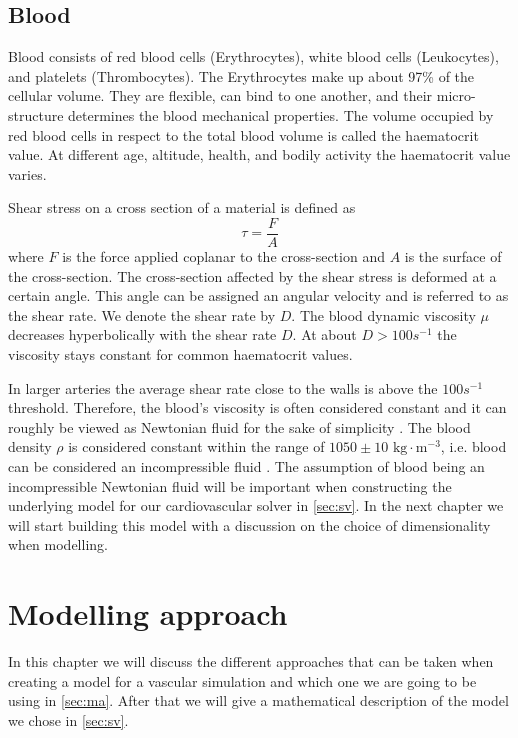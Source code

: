 \documentclass[a4paper, oneside]{discothesis}
\begin{document}
\section{Blood} \label{sec:b}
Blood consists of red blood cells (Erythrocytes), white blood cells (Leukocytes), and platelets (Thrombocytes).
The Erythrocytes make up about 97\% of the cellular volume.
They are flexible, can bind to one another, and their micro-structure determines the blood mechanical properties.
The volume occupied by red blood cells in respect to the total blood volume is called the haematocrit value.
At different age, altitude, health, and bodily activity the haematocrit value varies.

Shear stress on a cross section of a material is defined as 
\begin{equation}
	\tau = \frac{F}{A}
\end{equation}
where $F$ is the force applied coplanar to the cross-section and $A$ is the surface of the cross-section.
The cross-section affected by the shear stress is deformed at a certain angle. 
This angle can be assigned an angular velocity and is referred to as the shear rate.
We denote the shear rate by $D$. \cite{köppl2023dimension}
The blood dynamic viscosity $\mu$ decreases hyperbolically with the shear rate $D$.
At about $D > 100s^{-1}$ the viscosity stays constant for common haematocrit values.

In larger arteries the average shear rate close to the walls is above the $100s^{-1}$ threshold. \cite{MCDbook}
Therefore, the blood's viscosity is often considered constant and it can roughly be viewed as Newtonian fluid for the sake of simplicity \cite{fung2013biomechanics,guyton2006textbook,MCDbook,pedley_1980,zamir2000physics,zamir2006physics}. 
The blood density $\rho$ is considered constant within the range of $1050 \pm 10 \text{ kg}\cdot\text{m}^{-3}$, i.e. blood can be considered an incompressible fluid \cite{PMID:2658951,kenner1977continuous,helmig1997multiphase}.
The assumption of blood being an incompressible Newtonian fluid will be important when constructing the underlying model for our cardiovascular solver in \autoref{sec:sv}. In the next chapter we will start building this model with a discussion on the choice of dimensionality when modelling.

\chapter{Modelling approach} \label{chap:1dm}
In this chapter we will discuss the different approaches that can be taken when creating a model for a vascular simulation and which one we are going to be using in \autoref{sec:ma}.
After that we will give a mathematical description of the model we chose in \autoref{sec:sv}.
\end{document}
